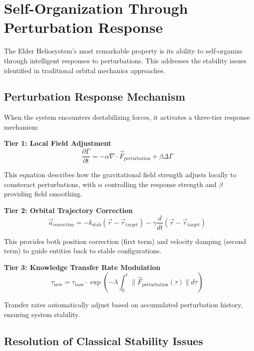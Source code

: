 \section{Self-Organization Through Perturbation Response}

The Elder Heliosystem's most remarkable property is its ability to self-organize through intelligent responses to perturbations. This addresses the stability issues identified in traditional orbital mechanics approaches.

\subsection{Perturbation Response Mechanism}

When the system encounters destabilizing forces, it activates a three-tier response mechanism:

\textbf{Tier 1: Local Field Adjustment}
\begin{equation}
\frac{\partial \Gamma}{\partial t} = -\alpha \nabla \cdot \vec{F}_{\text{perturbation}} + \beta \Delta \Gamma
\end{equation}

This equation describes how the gravitational field strength adjusts locally to counteract perturbations, with $\alpha$ controlling the response strength and $\beta$ providing field smoothing.

\textbf{Tier 2: Orbital Trajectory Correction}
\begin{equation}
\vec{a}_{\text{correction}} = -k_{\text{stab}} (\vec{r} - \vec{r}_{\text{target}}) - \gamma \frac{d}{dt}(\vec{r} - \vec{r}_{\text{target}})
\end{equation}

This provides both position correction (first term) and velocity damping (second term) to guide entities back to stable configurations.

\textbf{Tier 3: Knowledge Transfer Rate Modulation}
\begin{equation}
\tau_{\text{new}} = \tau_{\text{base}} \cdot \exp\left(-\lambda \int_0^t \|\vec{F}_{\text{perturbation}}(\tau)\| d\tau\right)
\end{equation}

Transfer rates automatically adjust based on accumulated perturbation history, ensuring system stability.

\subsection{Resolution of Classical Stability Issues}

